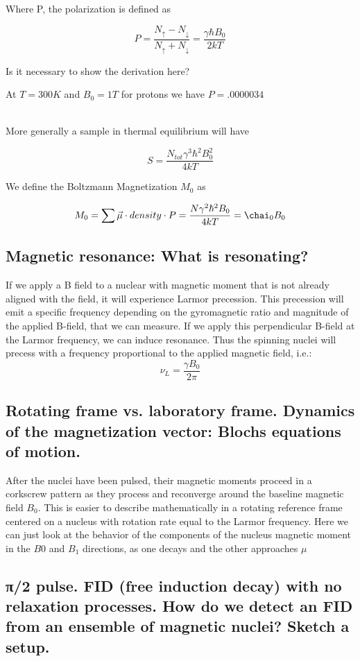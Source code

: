 \documentclass[12pt]{article}
\begin{document}
Where P, the polarization is defined as

\[P = \frac{N_{\uparrow} - N_{\downarrow}}{N_{\uparrow} + N_{\downarrow}} = \frac{\gamma \hbar B_0}{2kT}\]

Is it necessary to show the derivation here?

At $T= 300K$ and $B_0 = 1T$ for protons we have $P = .0000034$ \cite{pirl_youtube_mri}
\\\

More generally a sample in thermal equilibrium will have

\[S = \frac{N_{tot}\gamma^3\hbar^2B_0^2}{4kT}\]


We define the Boltzmann Magnetization $M_0$ as

\[M_0 = \sum \vec{\mu} \cdot density \cdot P = \frac{N\gamma^2\hbar^2B_0}{4kT} = \chai_0 B_0\]

\subsection { Magnetic resonance: What is resonating?}

If we apply a B field to a nuclear with magnetic moment that is not already aligned with the field, it will experience Larmor precession. This precession will emit a specific frequency depending on the gyromagnetic ratio and magnitude of the applied B-field, that we can measure. If we apply this perpendicular B-field at the Larmor frequency, we can induce resonance.
Thus the spinning nuclei will precess with a frequency proportional to the applied magnetic field, i.e.:
\[\nu_L = \frac{\gamma B_0}{2\pi}\]

\subsection {Rotating frame vs. laboratory frame. Dynamics of the magnetization vector: Blochs equations of motion.}

After the nuclei have been pulsed, their magnetic moments proceed in a corkscrew pattern as they process and reconverge around the baseline magnetic field $B_0$. This is easier to describe mathematically in a rotating reference frame centered on a nucleus with rotation rate equal to the Larmor frequency. Here we can just look at the behavior of the components of the nucleus magnetic moment in the $B0$ and $B_1$ directions, as one decays and the other approaches $\mu$

\subsection { π/2 pulse. FID (free induction decay) with no relaxation processes. How do we detect an FID from an ensemble of magnetic nuclei? Sketch a setup.}
\end{document}
